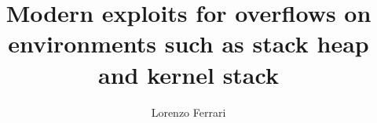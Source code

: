 \documentclass{theme/uniprthesis}
\title{Modern exploits for overflows on environments such as stack heap and kernel stack}
\author{Lorenzo Ferrari}
\begin{document}
    


    

    
 
\maketitle
\newpage

\mbox{} %
\newpage

\renewcommand{\contentsname}{Index}
\tableofcontents
    
    
    





\end{document}
